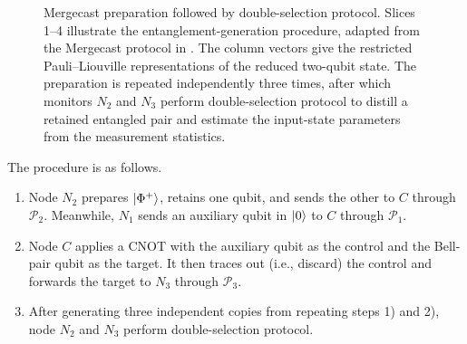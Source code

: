 \begin{figure}[tb]

    \caption{
        Mergecast preparation followed by double-selection protocol.
        Slices 1--4 illustrate the entanglement-generation procedure, adapted
        from the Mergecast protocol in
        \cite{wang2025quantumnetworktomographygeneral}.
        The column vectors give the restricted Pauli--Liouville
        representations of the reduced two-qubit state.
        The preparation is repeated independently three times, after which
        monitors \(N_2\) and \(N_3\) perform double-selection protocol to
        distill a retained entangled pair and estimate the input-state
        parameters from the measurement statistics.
    }
    \label{fig:modified-mergecast}
\end{figure}
The procedure is as follows.
\begin{enumerate}
    \item Node \(N_2\) prepares \(\ket{\Phi^+}\), retains one qubit,
          and sends the other to \(C\) through \(\mathcal P_2\). Meanwhile,
          \(N_1\) sends an auxiliary qubit in \(\ket{0}\) to \(C\) through
          \(\mathcal P_1\).

    \item Node \(C\) applies a CNOT with the auxiliary qubit as the
          control and the Bell-pair qubit as the target. It then traces out (i.e., discard)
          the control and forwards the target to \(N_3\) through
          \(\mathcal P_3\).
    \item After generating three independent copies from repeating steps 1) and 2), node \(N_2\) and
          \(N_3\) perform double-selection protocol.
\end{enumerate}

